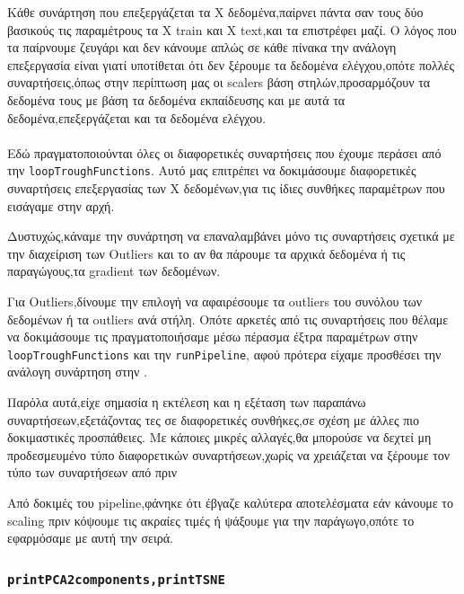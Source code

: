 Κάθε συνάρτηση που επεξεργάζεται τα X δεδομένα,παίρνει πάντα σαν τους δύο βασικούς τις παραμέτρους τα X train και X text,και τα επιστρέφει μαζί.
Ο λόγος που τα παίρνουμε ζευγάρι και δεν κάνουμε απλώς σε κάθε πίνακα την ανάλογη επεξεργασία είναι γιατί υποτίθεται ότι
δεν ξέρουμε τα δεδομένα ελέγχου,οπότε πολλές συναρτήσεις,όπως στην περίπτωση μας οι scalers βάση στηλών,προσαρμόζουν τα δεδομένα τους
με βάση τα δεδομένα εκπαίδευσης και με αυτά τα δεδομένα,επεξεργάζεται και τα δεδομένα ελέγχου.

\paragraph{\texttt{}}

Εδώ πραγματοποιούνται όλες οι διαφορετικές συναρτήσεις που έχουμε περάσει \linebreak
από την \texttt{loopTroughFunctions}.
Αυτό μας επιτρέπει να δοκιμάσουμε διαφορετικές συναρτήσεις επεξεργασίας των X δεδομένων,για τις ίδιες συνθήκες παραμέτρων που εισάγαμε στην αρχή.

Δυστυχώς,κάναμε την συνάρτηση να επαναλαμβάνει μόνο τις συναρτήσεις σχετικά με την διαχείριση των Outliers 
και το αν θα πάρουμε τα αρχικά δεδομένα ή τις παραγώγους,τα gradient των δεδομένων.

Για Outliers,δίνουμε την επιλογή να αφαιρέσουμε τα outliers του συνόλου των δεδομένων ή τα outliers ανά στήλη.
Οπότε αρκετές από τις συναρτήσεις που θέλαμε να δοκιμάσουμε τις πραγματοποιήσαμε μέσω πέρασμα έξτρα παραμέτρων \linebreak
στην \texttt{loopTroughFunctions} και την \texttt{runPipeline}, 
αφού πρότερα είχαμε προσθέσει την ανάλογη συνάρτηση στην \linebreak\texttt{}.

Παρόλα αυτά,είχε σημασία η εκτέλεση και η εξέταση των παραπάνω συναρτήσεων,εξετάζοντας τες σε διαφορετικές συνθήκες,σε σχέση με άλλες πιο δοκιμαστικές προσπάθειες.
Με κάποιες μικρές αλλαγές,θα μπορούσε να δεχτεί μη προδεσμευμένο τύπο διαφορετικών συναρτήσεων,χωρίς να χρειάζεται να ξέρουμε τον τύπο των συναρτήσεων από πριν

Από δοκιμές του pipeline,φάνηκε ότι έβγαζε καλύτερα αποτελέσματα εάν κάνουμε το scaling πριν κόψουμε τις ακραίες τιμές ή ψάξουμε για την παράγωγο,οπότε το εφαρμόσαμε με αυτή την σειρά.


\subsubsection{\texttt{printPCA2components,printTSNE}}


